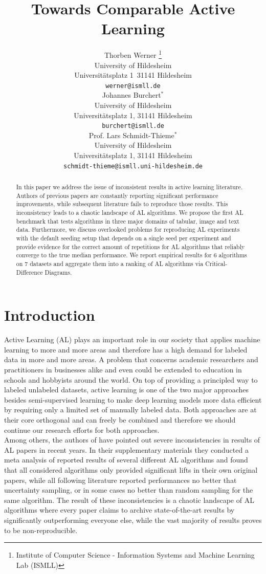 \documentclass[]{article}
\title{Towards Comparable Active Learning}
\author{%
	Thorben Werner 
	\thanks{Institute of Computer Science - Information Systems and Machine Learning Lab (ISMLL)} 
	\\
	University of Hildesheim\\
	Universitätsplatz 1\, 31141 Hildesheim \\
	\texttt{werner@ismll.de} \\
	\And
	Johannes Burchert$^*$ \\
	University of Hildesheim\\
	Universitätsplatz 1, 31141 Hildesheim \\
	\texttt{burchert@ismll.de} \\
	\AND
	Prof. Lars Schmidt-Thieme$^*$ \\
	University of Hildesheim\\
	Universitätsplatz 1, 31141 Hildesheim \\
	\texttt{schmidt-thieme@ismll.uni-hildesheim.de} \\
}
\begin{document}
\maketitle

\begin{abstract}
	In this paper we address the issue of inconsistent results in active learning literature.
	Authors of previous papers are constantly reporting significant performance improvements, while subsequent literature fails to reproduce those results. This inconsistency leads to a chaotic landscape of AL algorithms.
	We propose the first AL benchmark that tests algorithms in three major domains of tabular, image and text data.
	Furthermore, we discuss overlooked problems for reproducing AL experiments with the default seeding setup that depends on a single seed per experiment and provide evidence for the correct amount of repetitions for AL algorithms that reliably converge to the true median performance.
	We report empirical results for 6 algorithms on 7 datasets and aggregate them into a ranking of AL algorithms via Critical-Difference Diagrams.
\end{abstract}

\section{Introduction}
Active Learning (AL) plays an important role in our society that applies machine learning to more and more areas and therefore has a high demand for labeled data in more and more areas.
A problem that concerns academic researchers and practitioners in businesses alike and even could be extended to education in schools and hobbyists around the world.
On top of providing a principled way to labeled unlabeled datasets, active learning is one of the two major approaches besides semi-supervised learning to make deep learning models more data efficient by requiring only a limited set of manually labeled data.
Both approaches are at their core orthogonal and can freely be combined and therefore we should continue our research efforts for both approaches. \\
Among others, the authors of \cite{zhou2021towards} have pointed out severe inconsistencies in results of AL papers in recent years. 
In their supplementary materials they conducted a meta analysis of reported results of several different AL algorithms and found that all considered algorithms only provided significant lifts in their own original papers, while all following literature reported performances no better that uncertainty sampling, or in some cases no better than random sampling for the same algorithm.
The result of these inconsistencies is a chaotic landscape of AL algorithms where every paper claims to archive state-of-the-art results by significantly outperforming everyone else, while the vast majority of results proves to be non-reproducible.
\end{document}
